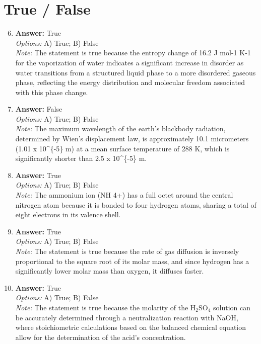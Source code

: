 \documentclass[12pt]{article}
\begin{document}
\section*{True / False}
\begin{enumerate}[label=\arabic*.]
\setcounter{enumi}{5}
\item \textbf{Answer:} True
\\ \textit{Options:} A) True; B) False
\\ \textit{Note:} The statement is true because the entropy change of 16.2 J mol-1 K-1 for the vaporization of water indicates a significant increase in disorder as water transitions from a structured liquid phase to a more disordered gaseous phase, reflecting the energy distribution and molecular freedom associated with this phase change.
\item \textbf{Answer:} False
\\ \textit{Options:} A) True; B) False
\\ \textit{Note:} The maximum wavelength of the earth's blackbody radiation, determined by Wien's displacement law, is approximately 10.1 micrometers (1.01 x 10^\{-5\} m) at a mean surface temperature of 288 K, which is significantly shorter than 2.5 x 10^\{-5\} m.
\item \textbf{Answer:} True
\\ \textit{Options:} A) True; B) False
\\ \textit{Note:} The ammonium ion (NH 4+) has a full octet around the central nitrogen atom because it is bonded to four hydrogen atoms, sharing a total of eight electrons in its valence shell.
\item \textbf{Answer:} True
\\ \textit{Options:} A) True; B) False
\\ \textit{Note:} The statement is true because the rate of gas diffusion is inversely proportional to the square root of its molar mass, and since hydrogen has a significantly lower molar mass than oxygen, it diffuses faster.
\item \textbf{Answer:} True
\\ \textit{Options:} A) True; B) False
\\ \textit{Note:} The statement is true because the molarity of the H$_{2}$SO$_{4}$ solution can be accurately determined through a neutralization reaction with NaOH, where stoichiometric calculations based on the balanced chemical equation allow for the determination of the acid's concentration.
\end{enumerate}
\end{document}
